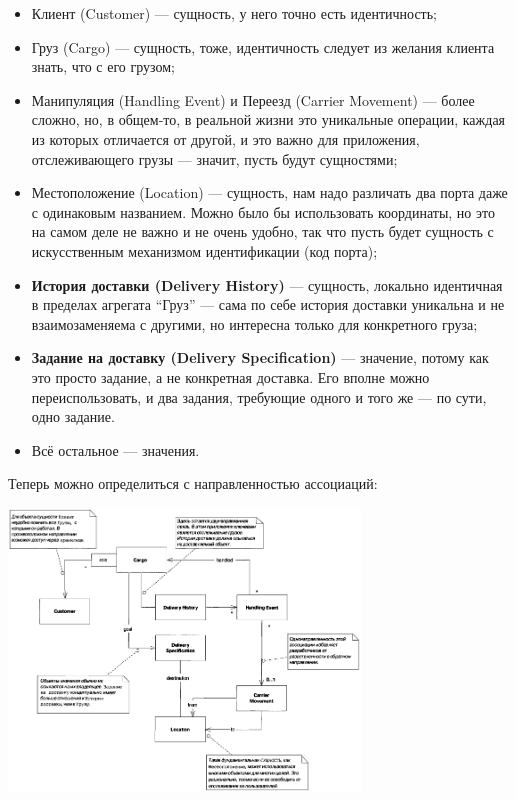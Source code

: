 \documentclass[a5paper]{article}
\begin{document}
\begin{itemize}
    \item Клиент (Customer) --- сущность, у него точно есть идентичность;
    \item Груз (Cargo) --- сущность, тоже, идентичность следует из желания клиента знать, что с его грузом;
    \item Манипуляция (Handling Event) и Переезд (Carrier Movement) --- более сложно, но, в общем-то, в реальной жизни это уникальные операции, каждая из которых отличается от другой, и это важно для приложения, отслеживающего грузы --- значит, пусть будут сущностями;
    \item Местоположение (Location) --- сущность, нам надо различать два порта даже с одинаковым названием. Можно было бы использовать координаты, но это на самом деле не важно и не очень удобно, так что пусть будет сущность с искусственным механизмом идентификации (код порта);
    \item \textbf{История доставки (Delivery History)} --- сущность, локально идентичная в пределах агрегата ``Груз'' --- сама по себе история доставки уникальна и не взаимозаменяема с другими, но интересна только для конкретного груза;
    \item \textbf{Задание на доставку (Delivery Specification)} --- значение, потому как это просто задание, а не конкретная доставка. Его вполне можно переиспользовать, и два задания, требующие одного и того же --- по сути, одно задание.
    \item Всё остальное --- значения.
\end{itemize}

Теперь можно определиться с направленностью ассоциаций:

\begin{center}
    \includegraphics[width=0.7\textwidth]{cargoAssociations.png}
\end{center}
\end{document}
